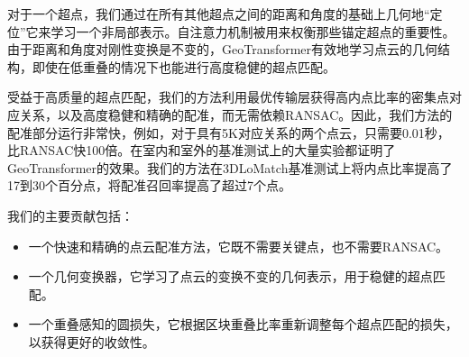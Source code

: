对于一个超点，我们通过在所有其他超点之间的距离和角度的基础上几何地“定位”它来学习一个非局部表示。自注意力机制被用来权衡那些锚定超点的重要性。由于距离和角度对刚性变换是不变的，GeoTransformer有效地学习点云的几何结构，即使在低重叠的情况下也能进行高度稳健的超点匹配。

受益于高质量的超点匹配，我们的方法利用最优传输层获得高内点比率的密集点对应关系，以及高度稳健和精确的配准，而无需依赖RANSAC。因此，我们方法的配准部分运行非常快，例如，对于具有5K对应关系的两个点云，只需要0.01秒，比RANSAC快100倍。在室内和室外的基准测试上的大量实验都证明了GeoTransformer的效果。我们的方法在3DLoMatch基准测试上将内点比率提高了17到30个百分点，将配准召回率提高了超过7个点。

我们的主要贡献包括：
\begin{itemize}
  \vspace{-8pt}
  \item 一个快速和精确的点云配准方法，它既不需要关键点，也不需要RANSAC。
  \vspace{-8pt}
  \item 一个几何变换器，它学习了点云的变换不变的几何表示，用于稳健的超点匹配。
  \vspace{-30pt}
  \item 一个重叠感知的圆损失，它根据区块重叠比率重新调整每个超点匹配的损失，以获得更好的收敛性。
\end{itemize}